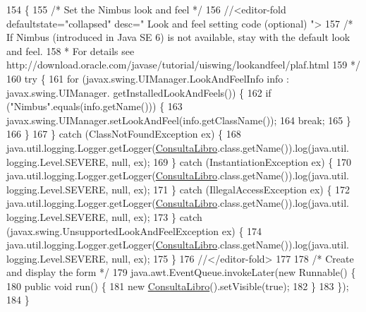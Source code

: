 \begin{DoxyCode}
154                                            \{
155         \textcolor{comment}{/* Set the Nimbus look and feel */}
156         \textcolor{comment}{//<editor-fold defaultstate="collapsed" desc=" Look and feel setting code (optional) ">}
157         \textcolor{comment}{/* If Nimbus (introduced in Java SE 6) is not available, stay with the default look and feel.}
158 \textcolor{comment}{         * For details see http://download.oracle.com/javase/tutorial/uiswing/lookandfeel/plaf.html }
159 \textcolor{comment}{         */}
160         \textcolor{keywordflow}{try} \{
161             \textcolor{keywordflow}{for} (javax.swing.UIManager.LookAndFeelInfo info : javax.swing.UIManager.
      getInstalledLookAndFeels()) \{
162                 \textcolor{keywordflow}{if} (\textcolor{stringliteral}{"Nimbus"}.equals(info.getName())) \{
163                     javax.swing.UIManager.setLookAndFeel(info.getClassName());
164                     \textcolor{keywordflow}{break};
165                 \}
166             \}
167         \} \textcolor{keywordflow}{catch} (ClassNotFoundException ex) \{
168             java.util.logging.Logger.getLogger(\mbox{\hyperlink{class_interfaz_package_1_1_consulta_libro_afe8f85b8f90c79821ff3dcecee8f4f5f}{ConsultaLibro}}.class.getName()).log(java.util.
      logging.Level.SEVERE, null, ex);
169         \} \textcolor{keywordflow}{catch} (InstantiationException ex) \{
170             java.util.logging.Logger.getLogger(\mbox{\hyperlink{class_interfaz_package_1_1_consulta_libro_afe8f85b8f90c79821ff3dcecee8f4f5f}{ConsultaLibro}}.class.getName()).log(java.util.
      logging.Level.SEVERE, null, ex);
171         \} \textcolor{keywordflow}{catch} (IllegalAccessException ex) \{
172             java.util.logging.Logger.getLogger(\mbox{\hyperlink{class_interfaz_package_1_1_consulta_libro_afe8f85b8f90c79821ff3dcecee8f4f5f}{ConsultaLibro}}.class.getName()).log(java.util.
      logging.Level.SEVERE, null, ex);
173         \} \textcolor{keywordflow}{catch} (javax.swing.UnsupportedLookAndFeelException ex) \{
174             java.util.logging.Logger.getLogger(\mbox{\hyperlink{class_interfaz_package_1_1_consulta_libro_afe8f85b8f90c79821ff3dcecee8f4f5f}{ConsultaLibro}}.class.getName()).log(java.util.
      logging.Level.SEVERE, null, ex);
175         \}
176         \textcolor{comment}{//</editor-fold>}
177 
178         \textcolor{comment}{/* Create and display the form */}
179         java.awt.EventQueue.invokeLater(\textcolor{keyword}{new} Runnable() \{
180             \textcolor{keyword}{public} \textcolor{keywordtype}{void} run() \{
181                 \textcolor{keyword}{new} \mbox{\hyperlink{class_interfaz_package_1_1_consulta_libro_afe8f85b8f90c79821ff3dcecee8f4f5f}{ConsultaLibro}}().setVisible(\textcolor{keyword}{true});
182             \}
183         \});
184     \}
\end{DoxyCode}


